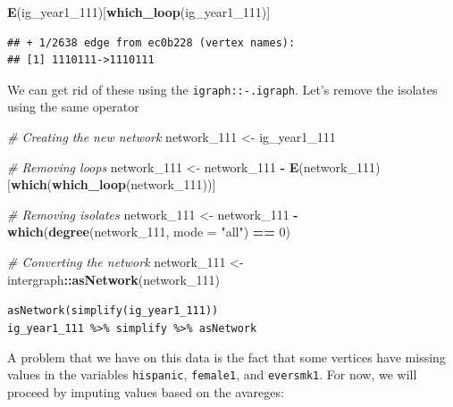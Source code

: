 \documentclass[]{book}
\newenvironment{Shaded}{\begin{snugshade}}{\end{snugshade}}
\newcommand{\CommentTok}[1]{\textcolor[rgb]{0.56,0.35,0.01}{\textit{#1}}}
\newcommand{\DataTypeTok}[1]{\textcolor[rgb]{0.13,0.29,0.53}{#1}}
\newcommand{\DecValTok}[1]{\textcolor[rgb]{0.00,0.00,0.81}{#1}}
\newcommand{\KeywordTok}[1]{\textcolor[rgb]{0.13,0.29,0.53}{\textbf{#1}}}
\newcommand{\NormalTok}[1]{#1}
\newcommand{\OperatorTok}[1]{\textcolor[rgb]{0.81,0.36,0.00}{\textbf{#1}}}
\newcommand{\StringTok}[1]{\textcolor[rgb]{0.31,0.60,0.02}{#1}}
\begin{document}
\begin{Shaded}
\begin{Highlighting}[]
\KeywordTok{E}\NormalTok{(ig_year1_}\DecValTok{111}\NormalTok{)[}\KeywordTok{which_loop}\NormalTok{(ig_year1_}\DecValTok{111}\NormalTok{)]}
\end{Highlighting}
\end{Shaded}

\begin{verbatim}
## + 1/2638 edge from ec0b228 (vertex names):
## [1] 1110111->1110111
\end{verbatim}

We can get rid of these using the \texttt{igraph::-.igraph}. Let's remove the isolates using the same operator

\begin{Shaded}
\begin{Highlighting}[]
\CommentTok{# Creating the new network}
\NormalTok{network_}\DecValTok{111}\NormalTok{ <-}\StringTok{ }\NormalTok{ig_year1_}\DecValTok{111}

\CommentTok{# Removing loops}
\NormalTok{network_}\DecValTok{111}\NormalTok{ <-}\StringTok{ }\NormalTok{network_}\DecValTok{111} \OperatorTok{-}\StringTok{ }\KeywordTok{E}\NormalTok{(network_}\DecValTok{111}\NormalTok{)[}\KeywordTok{which}\NormalTok{(}\KeywordTok{which_loop}\NormalTok{(network_}\DecValTok{111}\NormalTok{))]}

\CommentTok{# Removing isolates}
\NormalTok{network_}\DecValTok{111}\NormalTok{ <-}\StringTok{ }\NormalTok{network_}\DecValTok{111} \OperatorTok{-}\StringTok{ }\KeywordTok{which}\NormalTok{(}\KeywordTok{degree}\NormalTok{(network_}\DecValTok{111}\NormalTok{, }\DataTypeTok{mode =} \StringTok{"all"}\NormalTok{) }\OperatorTok{==}\StringTok{ }\DecValTok{0}\NormalTok{)}

\CommentTok{# Converting the network}
\NormalTok{network_}\DecValTok{111}\NormalTok{ <-}\StringTok{ }\NormalTok{intergraph}\OperatorTok{::}\KeywordTok{asNetwork}\NormalTok{(network_}\DecValTok{111}\NormalTok{)}
\end{Highlighting}
\end{Shaded}

\texttt{asNetwork(simplify(ig\_year1\_111))}
\texttt{ig\_year1\_111\ \%\textgreater{}\%\ simplify\ \%\textgreater{}\%\ asNetwork}

A problem that we have on this data is the fact that some vertices have
missing values in the variables \texttt{hispanic}, \texttt{female1}, and \texttt{eversmk1}. For now,
we will proceed by imputing values based on the avareges:
\end{document}
